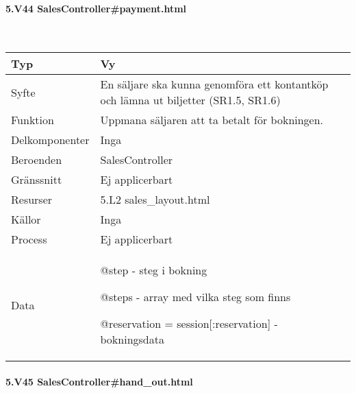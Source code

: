 \documentclass[a4paper, twoside, 11pt, titlepage]{article}
\begin{document}
			\paragraph{5.V44 SalesController\#payment.html}\

			\begin {table} [ht] \begin{tabular} {  p{3.5cm} p{9.6cm} }
				\hline
				{Typ} & {Vy} \\
				\hline
				{Syfte} & {En säljare ska kunna genomföra ett kontantköp och lämna ut biljetter (SR1.5, SR1.6)} \\
				\hline
				{Funktion} & {Uppmana säljaren att ta betalt för bokningen.} \\
				\hline
				{Delkomponenter} & {Inga} \\
				\hline
				{Beroenden} & {SalesController} \\
				\hline
				{Gränssnitt} & {Ej applicerbart} \\
				\hline
				{Resurser} & {5.L2 sales\_layout.html} \\
				\hline
				{Källor} & {Inga} \\
				\hline
				{Process} & {Ej applicerbart} \\
				\hline
				{Data} & {@step - steg i bokning

@steps - array med vilka steg som finns

@reservation = session[:reservation] - bokningsdata} \\
				\hline
			\end{tabular} \end{table} \FloatBarrier


			\paragraph{5.V45 SalesController\#hand\_out.html}\
\end{document}
